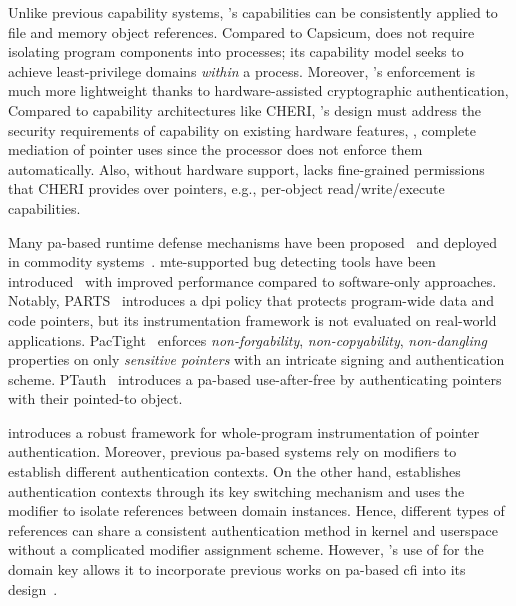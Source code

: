 Unlike previous capability systems, \thename's capabilities can be consistently applied to file and memory object references.
Compared to Capsicum, \thename does not require isolating program components into processes; its capability model seeks to achieve least-privilege domains \emph{within} a process.
Moreover, \thename's enforcement is much more lightweight thanks to hardware-assisted cryptographic authentication,
Compared to capability architectures like CHERI, \thename's design must address the security requirements of capability on existing hardware features, \eg, complete mediation of pointer uses since the processor does not enforce them automatically.
Also, without hardware support, \thename lacks fine-grained permissions that CHERI provides over pointers, e.g., per-object read/write/execute capabilities.

\label{sec:related-work:pa-mte-defenses}
Many \gls{pa}-based runtime defense mechanisms have been proposed~\cite{pac-it-up,pacsan,pacstack,pactight,kernel-pac,apple-pac,qualcomm-pac,ptauth} and deployed in commodity systems~\cite{apple-pac,qualcomm-pac}.
\gls{mte}-supported bug detecting tools have been introduced~\cite{memory-tagging,mte-kernel-support,mte-stack} with improved performance compared to software-only approaches.
Notably, PARTS~\cite{pac-it-up} introduces a \gls{dpi} policy that protects program-wide data and code pointers, but its instrumentation framework is not evaluated on real-world applications.
PacTight~\cite{pactight} enforces \emph{non-forgability}, \emph{non-copyability}, \emph{non-dangling} properties on only \emph{sensitive pointers} with an intricate signing and authentication scheme.
PTauth~\cite{ptauth} introduces a \gls{pa}-based use-after-free by authenticating pointers with their pointed-to object.

\thename introduces a robust framework for whole-program instrumentation of pointer authentication.
Moreover, previous \gls{pa}-based systems rely on modifiers to establish different authentication contexts.
On the other hand, \thename establishes authentication contexts through its key switching mechanism and uses the modifier to isolate references between domain instances.
Hence, different types of references can share a consistent authentication method in kernel and userspace without a complicated modifier assignment scheme.
However, \thename's use of  for the domain key allows it to incorporate previous works on \gls{pa}-based \gls{cfi} into its design~\cite{pac-it-up,pacstack,kernel-pac,apple-pac}.


